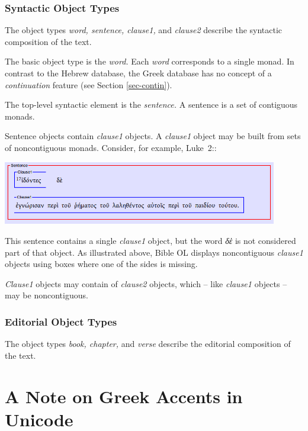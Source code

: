 \documentclass[11pt,oneside,a4paper]{memoir}
\newcommand*{\bibleref}[3]{#1~#2\thinspace:\thinspace#3}
\begin{document}
\subsubsection{Syntactic Object Types}

The object types \emph{word, sentence, clause1,} and \emph{clause2} describe the syntactic
composition of the text.

The basic object type is the \emph{word.} Each \emph{word} corresponds to a single monad. In
contrast to the Hebrew database, the Greek database has no concept of a \emph{continuation} feature
(see Section \ref{sec-contin}).

The top-level syntactic element is the \emph{sentence.} A sentence is a set of contiguous monads.

Sentence objects contain \emph{clause1} objects. A \emph{clause1} object may be built from sets of
noncontiguous monads. Consider, for example, \bibleref{Luke}{2}{17}:

\begin{center}
  \includegraphics[width=0.9\textwidth]{luke2_17.png}
\end{center}

This sentence contains a single \emph{clause1} object, but the word \emph{δὲ} is not considered part
of that object. As illustrated above, Bible OL displays noncontiguous \emph{clause1} objects using
boxes where one of the sides is missing.

\emph{Clause1} objects may contain of \emph{clause2} objects, which -- like \emph{clause1} objects --
may be noncontiguous.

\subsubsection{Editorial Object Types}

The object types \emph{book, chapter,} and \emph{verse} describe the editorial composition of the
text.

\section{A Note on Greek Accents in Unicode}
\end{document}
